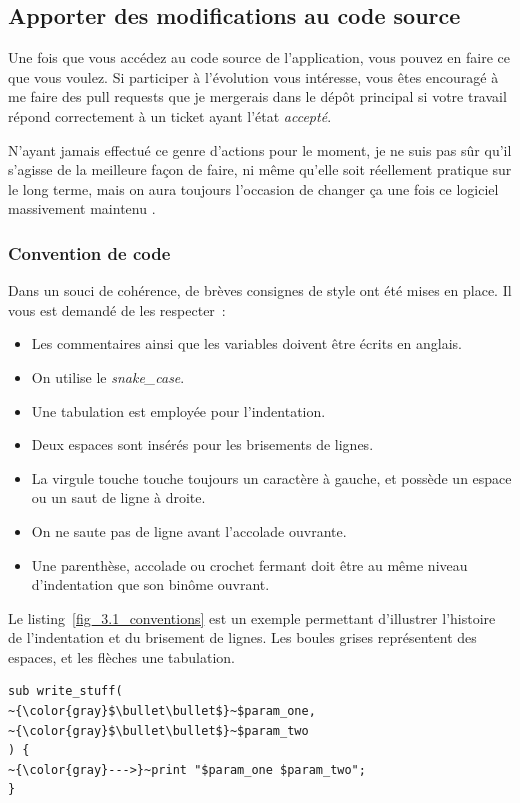 \subsection{Apporter des modifications au code source}

Une fois que vous accédez au code source de l'application, vous pouvez en faire ce que vous voulez.
Si participer à l'évolution vous intéresse, vous êtes encouragé à me faire des pull requests que je mergerais dans le dépôt principal si votre travail répond correctement à un ticket ayant l'état \emph{accepté}.

N'ayant jamais effectué ce genre d'actions pour le moment, je ne suis pas sûr qu'il s'agisse de la meilleure façon de faire, ni même qu'elle soit réellement pratique sur le long terme, mais on aura toujours l'occasion de changer ça une fois ce logiciel massivement maintenu \Winkey.

\subsubsection{Convention de code}

Dans un souci de cohérence, de brèves consignes de style ont été mises en place. Il vous est demandé de les respecter~:
\begin{itemize}
	\item Les commentaires ainsi que les variables doivent être écrits en anglais.
	\item On utilise le \emph{snake\_case}.
	\item Une tabulation est employée pour l'indentation.
	\item Deux espaces sont insérés pour les brisements de lignes.
	\item La virgule touche touche toujours un caractère à gauche, et possède un espace ou un saut de ligne à droite.
	\item On ne saute pas de ligne avant l'accolade ouvrante.
	\item Une parenthèse, accolade ou crochet fermant doit être au même niveau d'indentation que son binôme ouvrant.
\end{itemize}

Le listing~\ref{fig_3.1_conventions} est un exemple permettant d'illustrer l'histoire de l'indentation et du brisement de lignes.
Les boules grises représentent des espaces, et les flèches une tabulation.

\begin{lstlisting}[basicstyle=\normalsize, caption={Conventions de code}, label=fig_3.1_conventions]
sub write_stuff(
~{\color{gray}$\bullet\bullet$}~$param_one,
~{\color{gray}$\bullet\bullet$}~$param_two
) {
~{\color{gray}--->}~print "$param_one $param_two";
}
\end{lstlisting}

